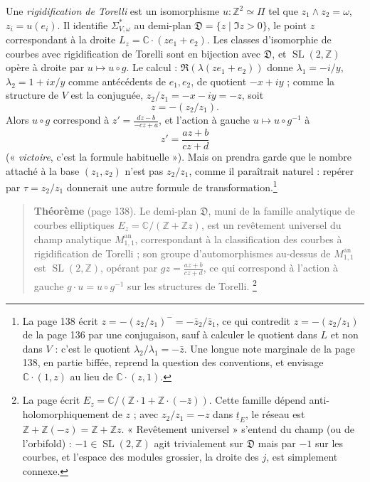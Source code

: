\documentclass[11pt,a4paper]{article}
\begin{document}
Une \emph{rigidification de Torelli} est un isomorphisme $u : \mathbb{Z}^2
\simeq \Pi$ tel que $z_1 \wedge z_2 = \omega$, $z_i = u(e_i)$. Il identifie
$\Sigma^{*}_{V,\omega}$ au demi-plan $\mathfrak{D} = \{z \mid \Im z > 0\}$, le
point $z$ correspondant à la droite $L_z = \mathbb{C} \cdot (z e_1 + e_2)$. Les
classes d'isomorphie de courbes avec rigidification de Torelli sont en
bijection avec $\mathfrak{D}$, et $\operatorname{SL}(2, \mathbb{Z})$ opère à
droite par $u \mapsto u \circ g$. Le calcul : $\Re(\lambda(z e_1 + e_2))$ donne
$\lambda_1 = -i/y$, $\lambda_2 = 1 + ix/y$ comme antécédents de $e_1, e_2$, de
quotient $-x + iy$ ; comme la structure de $V$ est la conjuguée, $z_2/z_1 =
-x - iy = -z$, soit
\[
z = -(z_2 / z_1) .
\]
Alors $u \circ g$ correspond à $z' = \frac{dz - b}{-cz + a}$, et l'action à gauche
$u \mapsto u \circ g^{-1}$ à
\[
z' = \frac{az + b}{cz + d}
\]
(« \emph{victoire}, c'est la formule habituelle »). Mais on prendra garde que le
nombre attaché à la base $(z_1, z_2)$ n'est pas $z_2/z_1$, comme il paraîtrait
naturel : repérer par $\tau = z_2/z_1$ donnerait une autre formule de
transformation.\footnote{La page 138 écrit $z = -(z_2/z_1)^{-} =
-\bar z_2/\bar z_1$, ce qui contredit $z = -(z_2/z_1)$ de la page 136 par une
conjugaison, sauf à calculer le quotient dans $L$ et non dans $V$ : c'est le
quotient $\lambda_2/\lambda_1 = -\bar z$. Une longue note marginale de la page
138, en partie biffée, reprend la question des conventions, et envisage
$\mathbb{C} \cdot (1, z)$ au lieu de $\mathbb{C} \cdot (z, 1)$.}

\begin{quote}
\textbf{Théorème} (page 138). Le demi-plan $\mathfrak{D}$, muni de la famille
analytique de courbes elliptiques $E_z = \mathbb{C}/(\mathbb{Z} + \mathbb{Z}z)$,
est un revêtement universel du champ analytique $M_{1,1}^{\mathrm{an}}$,
correspondant à la classification des courbes à rigidification de Torelli ; son
groupe d'automorphismes au-dessus de $M_{1,1}^{\mathrm{an}}$ est
$\operatorname{SL}(2, \mathbb{Z})$, opérant par $gz = \frac{az + b}{cz + d}$, ce
qui correspond à l'action à gauche $g \cdot u = u \circ g^{-1}$ sur les
structures de Torelli.
\footnote{La page écrit $E_z = \mathbb{C}/(\mathbb{Z} \cdot 1 + \mathbb{Z} \cdot
(-\bar z))$. Cette famille dépend anti-holomorphiquement de $z$ ; avec $z_2/z_1 =
-z$ dans $\underline{t}_E$, le réseau est $\mathbb{Z} + \mathbb{Z}(-z) =
\mathbb{Z} + \mathbb{Z}z$. « Revêtement universel » s'entend du champ (ou de
l'orbifold) : $-1 \in \operatorname{SL}(2, \mathbb{Z})$ agit trivialement sur
$\mathfrak{D}$ mais par $-1$ sur les courbes, et l'espace des modules grossier,
la droite des $j$, est simplement connexe.}
\end{quote}
\end{document}
